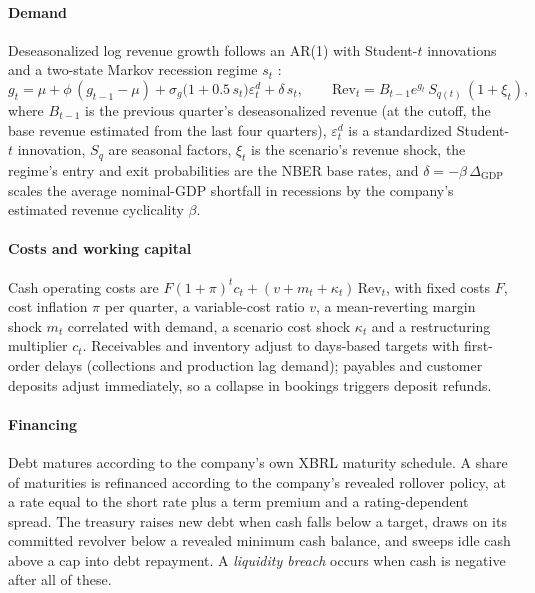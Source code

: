 \paragraph{Demand} Deseasonalized log revenue growth follows an AR(1) with Student-$t$ innovations and a two-state Markov recession regime $s_t$ \citep{hamilton1989}:
\begin{equation}
g_t=\mu+\phi\,(g_{t-1}-\mu)+\sigma_g\bigl(1+0.5\,s_t\bigr)\varepsilon^{d}_t+\delta\,s_t,\qquad
\mathrm{Rev}_t=B_{t-1}e^{g_t}\,S_{q(t)}\,(1+\xi_t),
\end{equation}
where $B_{t-1}$ is the previous quarter's deseasonalized revenue (at the cutoff, the base revenue estimated from the last four quarters), $\varepsilon^{d}_t$ is a standardized Student-$t$ innovation, $S_{q}$ are seasonal factors, $\xi_t$ is the scenario's revenue shock, the regime's entry and exit probabilities are the NBER base rates, and $\delta=-\beta\,\Delta_{\mathrm{GDP}}$ scales the average nominal-GDP shortfall in recessions by the company's estimated revenue cyclicality $\beta$.

\paragraph{Costs and working capital} Cash operating costs are $F(1+\pi)^t c_t+(v+m_t+\kappa_t)\,\mathrm{Rev}_t$, with fixed costs $F$, cost inflation $\pi$ per quarter, a variable-cost ratio $v$, a mean-reverting margin shock $m_t$ correlated with demand, a scenario cost shock $\kappa_t$ and a restructuring multiplier $c_t$. Receivables and inventory adjust to days-based targets with first-order delays (collections and production lag demand); payables and customer deposits adjust immediately, so a collapse in bookings triggers deposit refunds.

\paragraph{Financing} Debt matures according to the company's own XBRL maturity schedule. A share of maturities is refinanced according to the company's revealed rollover policy, at a rate equal to the short rate plus a term premium and a rating-dependent spread. The treasury raises new debt when cash falls below a target, draws on its committed revolver below a revealed minimum cash balance, and sweeps idle cash above a cap into debt repayment. A \emph{liquidity breach} occurs when cash is negative after all of these.

